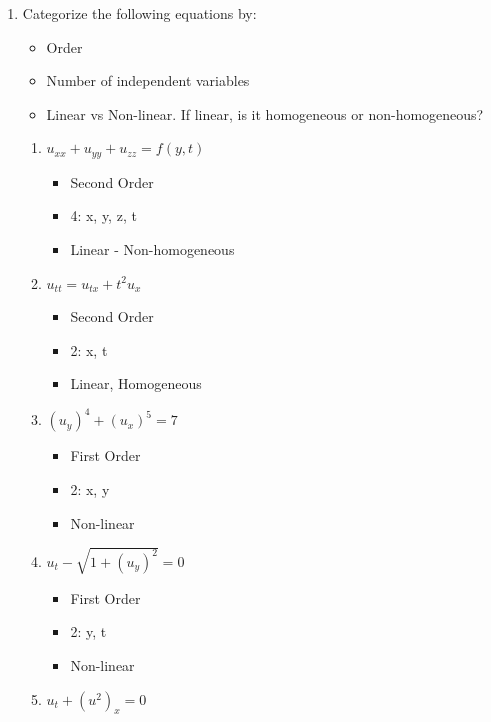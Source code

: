 \documentclass{article}
\begin{document}
\begin{enumerate}
  \item Categorize the following equations by:
  \begin{itemize}
    \item Order
    \item Number of independent variables
    \item Linear vs Non-linear. If linear, is it homogeneous or non-homogeneous?
  \end{itemize}
  \begin{enumerate}
    \item $u_{xx} + u_{yy} + u_{zz} = f(y, t)$
    \begin{itemize}
      \item Second Order
      \item 4: x, y, z, t
      \item Linear - Non-homogeneous
    \end{itemize}
    \item $u_{tt} = u_{tx} + t^2u_x$
    \begin{itemize}
      \item Second Order
      \item 2: x, t
      \item Linear, Homogeneous
    \end{itemize}
    \item $(u_y)^4 + (u_x)^5 = 7$
    \begin{itemize}
      \item First Order
      \item 2: x, y
      \item Non-linear
    \end{itemize}
    \item $u_t - \sqrt{1 + (u_y)^2} = 0$
    \begin{itemize}
      \item First Order
      \item 2: y, t
      \item Non-linear
    \end{itemize}
    \item $u_t + (u^2)_x = 0$

\end{enumerate}
\end{enumerate}
\end{document}

